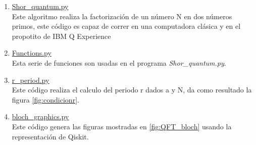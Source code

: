 \begin{enumerate}
    \item \label{cod:shorquanrum} \href{https://github.com/giovannilopez9808/Notas_Agosto_2020/blob/master/AMC/Proyecto_final/Scripts/General/Shor_quantum.py}{Shor\_quantum.py}\\
    Este algoritmo realiza la factorización de un número N en dos números primos, este código es capaz de correr en una computadora clásica y en el propotito de IBM Q Experience
    \item \href{https://github.com/giovannilopez9808/Notas_Agosto_2020/blob/master/AMC/Proyecto_final/Scripts/General/Functions.py}{Functions.py \label{cod:functionsshor}}\\
    Esta serie de funciones son usadas en el programa \textit{Shor\_quantum.py}.
    \item \href{https://github.com/giovannilopez9808/Notas_Agosto_2020/blob/master/AMC/Proyecto_final/Scripts/General/r_period.py}{r\_period.py \label{cod:rperiod}}\\
    Este código realiza el calculo del periodo r dados a y N, da como resultado la figura  \ref{fig:condicionr}.
    \item \href{https://github.com/giovannilopez9808/Notas_Agosto_2020/blob/master/AMC/Proyecto_final/Scripts/General/bloch_graphics.py}{bloch\_graphics.py \label{cod:bloch}}\\
    Este código genera las figuras mostradas en \ref{fig:QFT_bloch} usando la representación de Qiskit.
\end{enumerate}